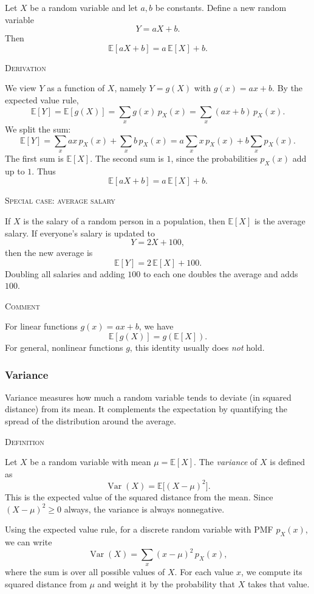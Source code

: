 Let \(X\) be a random variable and let \(a, b\) be constants.  
Define a new random variable
\[
Y = aX + b.
\]
Then
\[
\mathbb{E}[aX + b] = a\,\mathbb{E}[X] + b.
\]

\bigskip\textsc{Derivation}

We view \(Y\) as a function of \(X\), namely \(Y = g(X)\) with \(g(x) = ax + b\).  
By the expected value rule,
\[
\mathbb{E}[Y] = \mathbb{E}[g(X)] = \sum_{x} g(x)\,p_X(x)
              = \sum_{x} (ax + b)\,p_X(x).
\]
We split the sum:
\[
\mathbb{E}[Y]
= \sum_{x} ax\,p_X(x) + \sum_{x} b\,p_X(x)
= a \sum_{x} x\,p_X(x) + b \sum_{x} p_X(x).
\]
The first sum is \(\mathbb{E}[X]\).  
The second sum is \(1\), since the probabilities \(p_X(x)\) add up to \(1\).  
Thus
\[
\mathbb{E}[aX + b] = a\,\mathbb{E}[X] + b.
\]

\bigskip\textsc{Special case: average salary}

If \(X\) is the salary of a random person in a population, then \(\mathbb{E}[X]\) is the average salary.  
If everyone’s salary is updated to
\[
Y = 2X + 100,
\]
then the new average is
\[
\mathbb{E}[Y] = 2\,\mathbb{E}[X] + 100.
\]
Doubling all salaries and adding \(100\) to each one doubles the average and adds \(100\).

\bigskip\textsc{Comment}

For linear functions \(g(x) = ax + b\), we have
\[
\mathbb{E}[g(X)] = g(\mathbb{E}[X]).
\]
For general, nonlinear functions \(g\), this identity usually does \textit{not} hold.



\subsubsection{Variance}

Variance measures how much a random variable tends to deviate (in squared distance) from its mean.  
It complements the expectation by quantifying the spread of the distribution around the average.

\bigskip\textsc{Definition}

Let \(X\) be a random variable with mean \(\mu = \mathbb{E}[X]\).  
The \textit{variance} of \(X\) is defined as
\[
\operatorname{Var}(X) = \mathbb{E}\bigl[(X - \mu)^2\bigr].
\]
This is the expected value of the squared distance from the mean.  
Since \((X - \mu)^2 \ge 0\) always, the variance is always nonnegative.

Using the expected value rule, for a discrete random variable with PMF \(p_X(x)\), we can write
\[
\operatorname{Var}(X)
= \sum_{x} (x - \mu)^2\,p_X(x),
\]
where the sum is over all possible values of \(X\). 
For each value \(x\), we compute its squared distance from \(\mu\) and weight it by the probability that \(X\) takes that value.

